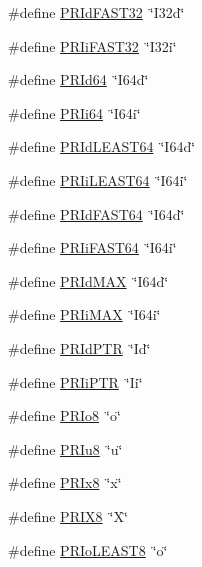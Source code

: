 \begin{DoxyCompactItemize}
\item 
\#define \hyperlink{a00113_aef5a98227a6af5fde95353ed303cfd1e}{P\+R\+Id\+F\+A\+S\+T32}~\char`\"{}I32d\char`\"{}
\item 
\#define \hyperlink{a00113_a192a69a2e6e63ed8393d306b4078d63f}{P\+R\+Ii\+F\+A\+S\+T32}~\char`\"{}I32i\char`\"{}
\item 
\#define \hyperlink{a00113_ae372e90b62c1e8b51dc5d95bf7f5ba48}{P\+R\+Id64}~\char`\"{}I64d\char`\"{}
\item 
\#define \hyperlink{a00113_ab8d0c29be4a0623c3de58011991e86e9}{P\+R\+Ii64}~\char`\"{}I64i\char`\"{}
\item 
\#define \hyperlink{a00113_a6e7b87b6cb5b8298e0c7471f19d8321f}{P\+R\+Id\+L\+E\+A\+S\+T64}~\char`\"{}I64d\char`\"{}
\item 
\#define \hyperlink{a00113_a0fb9f5cdca16045cc30b72d9174cdbfb}{P\+R\+Ii\+L\+E\+A\+S\+T64}~\char`\"{}I64i\char`\"{}
\item 
\#define \hyperlink{a00113_a9c63f907b68bfa374778aa59b3a360f5}{P\+R\+Id\+F\+A\+S\+T64}~\char`\"{}I64d\char`\"{}
\item 
\#define \hyperlink{a00113_af27d75f27f8038693a36c3dd14a82516}{P\+R\+Ii\+F\+A\+S\+T64}~\char`\"{}I64i\char`\"{}
\item 
\#define \hyperlink{a00113_a11a8b311e64e0415db0d106fcebf6597}{P\+R\+Id\+M\+AX}~\char`\"{}I64d\char`\"{}
\item 
\#define \hyperlink{a00113_a0f30e8063c747a19c86574a1f61c0ad5}{P\+R\+Ii\+M\+AX}~\char`\"{}I64i\char`\"{}
\item 
\#define \hyperlink{a00113_a7c8a9ccd40bd2053ca588d1b15e76a30}{P\+R\+Id\+P\+TR}~\char`\"{}Id\char`\"{}
\item 
\#define \hyperlink{a00113_ac2d52bf83b783f530f02fa2eeabe703a}{P\+R\+Ii\+P\+TR}~\char`\"{}Ii\char`\"{}
\item 
\#define \hyperlink{a00113_ad12493b9063f7b2630b90b7f9a7f3301}{P\+R\+Io8}~\char`\"{}o\char`\"{}
\item 
\#define \hyperlink{a00113_a8673208d2d48018fcce020ef59f8ec4f}{P\+R\+Iu8}~\char`\"{}u\char`\"{}
\item 
\#define \hyperlink{a00113_adac1acc1d24060aeee7791a99d1a3a8c}{P\+R\+Ix8}~\char`\"{}x\char`\"{}
\item 
\#define \hyperlink{a00113_a4e9b835c85ffa875e8304e2b852b4c86}{P\+R\+I\+X8}~\char`\"{}X\char`\"{}
\item 
\#define \hyperlink{a00113_aa5b3ca8091f4ed7d43f5eb971ce11114}{P\+R\+Io\+L\+E\+A\+S\+T8}~\char`\"{}o\char`\"{}
\item 

\end{DoxyCompactItemize}
